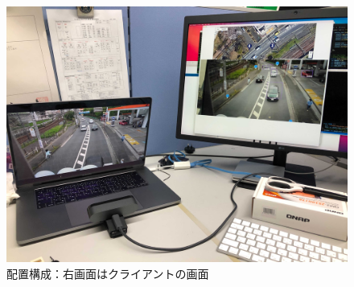 \documentclass[technicalreport]{ieicej}
\begin{document}
\begin{figure}[t]
  \includegraphics*[bb=0 0 4100 3000, width=1\linewidth]{./images/kensyo.jpg}
  \caption{配置構成：右画面はクライアントの画面} 
  \label{tab:kensyo}
\end{figure}
\end{document}
